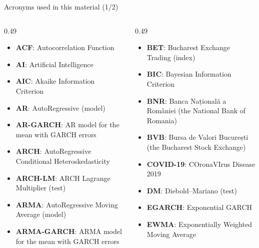{
\begin{frame}[noframenumbering]
    \titlepage
\end{frame}
}
\begin{frame}{Acronyms used in this material (1/2)}
\begin{columns}[T]
\begin{column}{0.49\textwidth}
\begin{itemize}\setlength{\itemsep}{0pt}
    \item \textbf{ACF}: Autocorrelation Function
    \item \textbf{AI}: Artificial Intelligence
    \item \textbf{AIC}: Akaike Information Criterion
    \item \textbf{AR}: AutoRegressive (model)
    \item \textbf{AR-GARCH}: AR model for the mean with GARCH errors
    \item \textbf{ARCH}: AutoRegressive Conditional Heteroskedasticity
    \item \textbf{ARCH-LM}: ARCH Lagrange Multiplier (test)
    \item \textbf{ARMA}: AutoRegressive Moving Average (model)
    \item \textbf{ARMA-GARCH}: ARMA model for the mean with GARCH errors
\end{itemize}
\end{column}
\begin{column}{0.49\textwidth}
\begin{itemize}\setlength{\itemsep}{0pt}
    \item \textbf{BET}: Bucharest Exchange Trading (index)
    \item \textbf{BIC}: Bayesian Information Criterion
    \item \textbf{BNR}: Banca Națională a României (the National Bank of Romania)
    \item \textbf{BVB}: Bursa de Valori București (the Bucharest Stock Exchange)
    \item \textbf{COVID-19}: COronaVIrus Disease 2019
    \item \textbf{DM}: Diebold–Mariano (test)
    \item \textbf{EGARCH}: Exponential GARCH
    \item \textbf{EWMA}: Exponentially Weighted Moving Average
\end{itemize}
\end{column}
\end{columns}
\end{frame}
